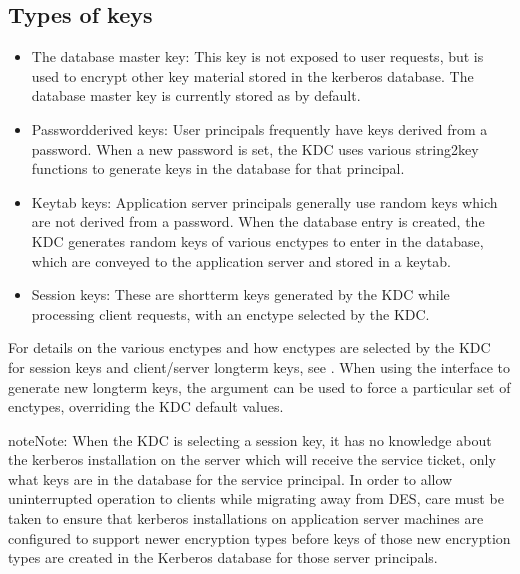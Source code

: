 \documentclass[letterpaper,10pt,english]{sphinxmanual}
\begin{document}
\subsection{Types of keys}
\label{\detokenize{admin/advanced/retiring-des:types-of-keys}}\begin{itemize}
\item {} 
\sphinxAtStartPar
The database master key:  This key is not exposed to user requests,
but is used to encrypt other key material stored in the kerberos
database.  The database master key is currently stored as 
by default.

\item {} 
\sphinxAtStartPar
Password\sphinxhyphen{}derived keys:  User principals frequently have keys
derived from a password.  When a new password is set, the KDC
uses various string2key functions to generate keys in the database
for that principal.

\item {} 
\sphinxAtStartPar
Keytab keys:  Application server principals generally use random
keys which are not derived from a password.  When the database
entry is created, the KDC generates random keys of various enctypes
to enter in the database, which are conveyed to the application server
and stored in a keytab.

\item {} 
\sphinxAtStartPar
Session keys:  These are short\sphinxhyphen{}term keys generated by the KDC while
processing client requests, with an enctype selected by the KDC.

\end{itemize}

\sphinxAtStartPar
For details on the various enctypes and how enctypes are selected by the KDC
for session keys and client/server long\sphinxhyphen{}term keys, see {\hyperref[\detokenize{admin/enctypes:enctypes}]{}}.
When using the {\hyperref[\detokenize{admin/admin_commands/kadmin_local:kadmin-1}]{}} interface to generate new long\sphinxhyphen{}term keys,
the  argument can be used to force a particular set of enctypes,
overriding the KDC default values.

\begin{sphinxadmonition}{note}{Note:}
\sphinxAtStartPar
When the KDC is selecting a session key, it has no knowledge about the
kerberos installation on the server which will receive the service ticket,
only what keys are in the database for the service principal.
In order to allow uninterrupted operation to
clients while migrating away from DES, care must be taken to ensure that
kerberos installations on application server machines are configured to
support newer encryption types before keys of those new encryption types
are created in the Kerberos database for those server principals.
\end{sphinxadmonition}
\end{document}
